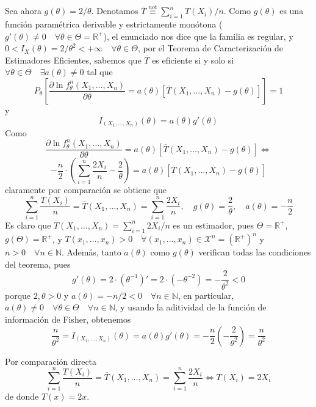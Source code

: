 \documentclass[12pt]{article}
\newcommand{\R}{\mathbb{R}}
\newcommand{\Rmas}{\R^{+}}
\newcommand{\X}{\mathcal{X}}
\newcommand{\N}{\mathbb{N}}
\begin{document}
\begin{ejercicio}
\begin{enumerate}
\begin{enumerate}
                Sea ahora $g(\theta) = 2 / \theta$. Denotamos $\overline{T} \stackrel{not}{\equiv} \sum_{i=1}^n T(X_i)/n$. Como $g(\theta)$ es una función paramétrica derivable y estrictamente monótona
                ($g'(\theta) \neq 0 \quad \forall \theta \in \Theta = \Rmas$), el enunciado nos dice que la familia es regular, y 
                $0 < I_X(\theta) = 2 / \theta^2 < +\infty \quad \forall \theta \in \Theta$, por el Teorema de Caracterización de Estimadores Eficientes, sabemos que $\overline{T}$ es 
                eficiente si y solo si $\forall \theta \in \Theta
                \quad \exists a(\theta) \neq 0$ tal que 
                $$P_\theta \left[ \dfrac{\partial \ln f_\theta^n(X_1, \ldots, X_n)}{\partial \theta} = a(\theta)[\overline{T}(X_1, \ldots, X_n) - g(\theta)]\right] = 1$$
                y
                $$I_{(X_1, \ldots, X_n)}(\theta) = a(\theta) g'(\theta)$$
                Como 
                $$\dfrac{\partial \ln f_\theta^n(X_1, \ldots, X_n)}{\partial \theta} = a(\theta)[\overline{T}(X_1, \ldots, X_n) - g(\theta)] \iff$$
                $$-\dfrac{n}{2} \cdot \left( \sum_{i=1}^n \dfrac{2X_i}{n} - \dfrac{2}{\theta} \right) = a(\theta) [\overline{T}(X_1, \ldots, X_n) - g(\theta)]$$
                claramente por comparación se obtiene que 
                $$\sum_{i=1}^n \dfrac{T(X_i)}{n} = \overline{T}(X_1, \ldots, X_n) = \sum_{i=1}^{n} \dfrac{2X_i}{n}, \quad g(\theta) = \dfrac{2}{\theta}, \quad a(\theta) = -\dfrac{n}{2}$$
                Es claro que $\overline{T}(X_1, \ldots, X_n) = \sum_{i=1}^n 2X_i/n$ es un estimador, pues $\Theta = \Rmas$, $g(\Theta) = \Rmas$, y $T(x_1, \ldots, x_n) > 0 \quad \forall (x_1, \ldots, x_n) \in \X^n = (\Rmas)^n$
                y $n > 0 \quad \forall n \in \N$. Además, tanto 
                $a(\theta)$ como $g(\theta)$ verifican todas las condiciones del teorema, pues $$g'(\theta) = 2 \cdot (\theta^{-1})' = 2 \cdot (- \theta^{-2}) = -\dfrac{2}{\theta^2} < 0$$ porque $2, \theta > 0$
                y $a(\theta) = -n/2 < 0 \quad \forall n \in \N$, en particular, $a(\theta) \neq 0 \quad \forall \theta \in \Theta \quad \forall n \in \N$, y usando la aditividad de la función de información de Fisher, obtenemos
                $$\dfrac{n}{\theta^2} = I_{(X_1, \ldots, X_n)}(\theta) = a(\theta) g'(\theta) = -\dfrac{n}{2} \left( -\dfrac{2}{\theta^2} \right) = \dfrac{n}{\theta^2}$$

                Por comparación directa $$\sum_{i=1}^n \dfrac{T(X_i)}{n} = \overline{T}(X_1, \ldots, X_n) = \sum_{i=1}^{n} \dfrac{2X_i}{n} \iff T(X_i) = 2 X_i$$
                de donde $T(x) = 2x$.
            \end{enumerate}
        \end{enumerate}
    \end{ejercicio}
\end{document}
